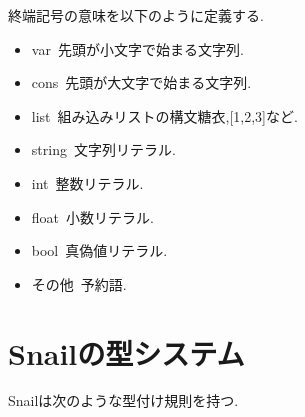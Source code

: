 \documentclass{jsarticle}
\begin{document}
終端記号の意味を以下のように定義する.

\begin{itemize}
  \item var\ 先頭が小文字で始まる文字列.
  \item cons\ 先頭が大文字で始まる文字列.
  \item list\ 組み込みリストの構文糖衣,[1,2,3]など.
  \item string\ 文字列リテラル.
  \item int\ 整数リテラル.
  \item float\ 小数リテラル.
  \item bool\ 真偽値リテラル.
  \item その他\ 予約語.
\end{itemize}

\newpage

\section{Snailの型システム}

Snailは次のような型付け規則を持つ.
\end{document}

